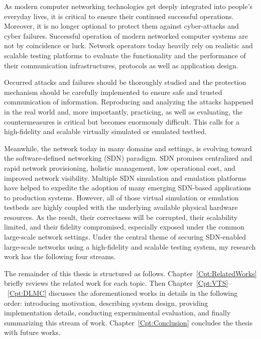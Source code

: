 
As modern computer networking technologies get deeply integrated into people's everyday lives,
it is critical to ensure their continued successful operations.
Moreover, it is no longer optional to protect them against cyber-attacks and cyber failures.
Successful operation of modern networked computer systems are not by coincidence or luck.
Network operators today heavily rely on realistic and scalable testing platforms to
evaluate the functionality and the performance of their communication infrastructures, protocols as well as application design.

Occurred attacks and failures should be thoroughly studied and the protection mechanism should be carefully implemented to ensure safe and trusted communication of information.
Reproducing and analyzing the attacks happened in the real world and, more importantly, practicing, as well as evaluating, the countermeasures is critical but becomes
enormously difficult.
This calls for a high-fidelity and scalable virtually simulated or emulated testbed.

Meanwhile, the network today in many domains and settings, is evolving toward the software-defined networking (SDN) paradigm.
SDN promises centralized and rapid network provisioning, holistic management, low operational cost, and improved network visibility.
Multiple SDN simulation and emulation platforms have helped to expedite the adoption of many emerging SDN-based applications to production systems.
However, all of those virtual simulation or emulation testbeds are highly coupled with the underlying available physical hardware resources.
As the result, their correctness will be corrupted, their scalability limited, and their fidelity compromised,
especially exposed under the common large-scale network settings.
Under the central theme of securing SDN-enabled large-scale networks using a high-fidelity and scalable testing system,
my research work has the following four streams.






The remainder of this thesis is structured as follows.
Chapter~\ref{Cpt:RelatedWorks} briefly reviews the related work for each topic.
Then Chapter~\ref{Cpt:VTS}--~\ref{Cpt:DLMC} discusses the aforementioned works in details in the following order:
introducing motivation, describing system design, providing implementation details,
conducting expermimental evaluation, and finally summarizing this stream of work.
Chapter~\ref{Cpt:Conclusion} concludes the thesis with future works.

